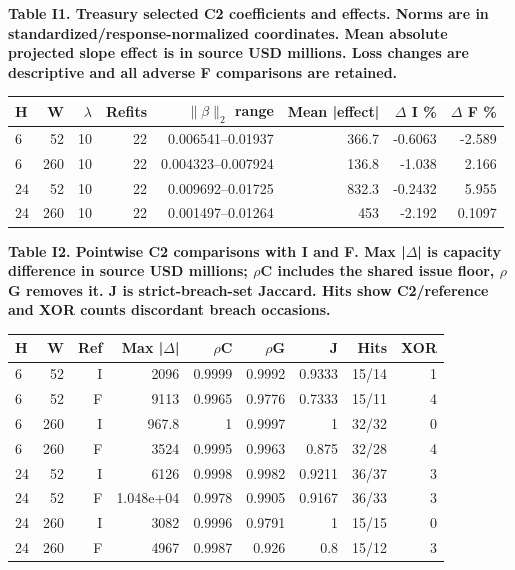 \documentclass[10pt,a4paper]{article}
\begin{document}
\begin{center}
\begin{minipage}{\linewidth}
\small\textbf{Table I1. Treasury selected C2 coefficients and effects. Norms are in standardized/response-normalized coordinates. Mean absolute projected slope effect is in source USD millions. Loss changes are descriptive and all adverse F comparisons are retained.}\par\medskip
\centering\fontsize{8}{10}\selectfont
\begin{tabular}{lrrrrrrr}
\toprule
H & W & \(\lambda\) & Refits & \(\|\beta\|_2\) range & Mean |effect| & \(\Delta\) I \% & \(\Delta\) F \% \\
\midrule
6 & 52 & 10 & 22 & 0.006541--0.01937 & 366.7 & -0.6063 & -2.589 \\
6 & 260 & 10 & 22 & 0.004323--0.007924 & 136.8 & -1.038 & 2.166 \\
24 & 52 & 10 & 22 & 0.009692--0.01725 & 832.3 & -0.2432 & 5.955 \\
24 & 260 & 10 & 22 & 0.001497--0.01264 & 453 & -2.192 & 0.1097 \\
\bottomrule
\end{tabular}
\end{minipage}
\end{center}
\begin{center}
\begin{minipage}{\linewidth}
\small\textbf{Table I2. Pointwise C2 comparisons with I and F. Max |\(\Delta\)| is capacity difference in source USD millions; \(\rho\)C includes the shared issue floor, \(\rho\)G removes it. J is strict-breach-set Jaccard. Hits show C2/reference and XOR counts discordant breach occasions.}\par\medskip
\centering\fontsize{8}{10}\selectfont
\begin{tabular}{lrrrrrrrr}
\toprule
H & W & Ref & Max |\(\Delta\)| & \(\rho\)C & \(\rho\)G & J & Hits & XOR \\
\midrule
6 & 52 & I & 2096 & 0.9999 & 0.9992 & 0.9333 & 15/14 & 1 \\
6 & 52 & F & 9113 & 0.9965 & 0.9776 & 0.7333 & 15/11 & 4 \\
6 & 260 & I & 967.8 & 1 & 0.9997 & 1 & 32/32 & 0 \\
6 & 260 & F & 3524 & 0.9995 & 0.9963 & 0.875 & 32/28 & 4 \\
24 & 52 & I & 6126 & 0.9998 & 0.9982 & 0.9211 & 36/37 & 3 \\
24 & 52 & F & 1.048e+04 & 0.9978 & 0.9905 & 0.9167 & 36/33 & 3 \\
24 & 260 & I & 3082 & 0.9996 & 0.9791 & 1 & 15/15 & 0 \\
24 & 260 & F & 4967 & 0.9987 & 0.926 & 0.8 & 15/12 & 3 \\
\bottomrule
\end{tabular}
\end{minipage}
\end{center}
\end{document}
